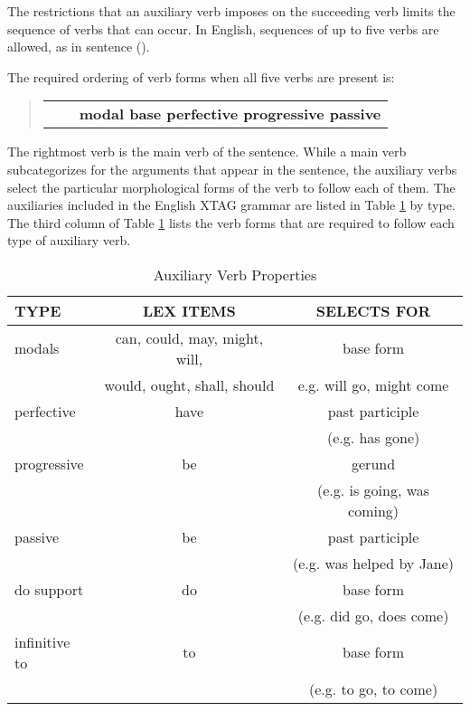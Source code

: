 \noindent The restrictions that an auxiliary verb imposes on the succeeding verb limits
the sequence of verbs that can occur.  In English, sequences of up to five
verbs are allowed, as in sentence ().


\noindent 
The required ordering of verb forms when all five verbs are present is:

\begin{quote}
\begin{tabular}{ccl}
& & {\bf modal base perfective progressive passive}
\end{tabular}
\end{quote}

\noindent
The rightmost verb is the main verb of the sentence.  While a main verb
subcategorizes for the arguments that appear in the sentence, the auxiliary
verbs select the particular morphological forms of the verb to follow each of
them.  The auxiliaries included in the English XTAG grammar are listed in Table
\ref{aux-table} by type.  The third column of Table \ref{aux-table} lists the
verb forms that are required to follow each type of auxiliary verb.

\begin{table}[ht]
\centering
\begin{tabular}{|l|c|c|}  
\hline
TYPE&LEX ITEMS&SELECTS FOR\\     
\hline
modals & can, could, may, might, will, & base form\footnotemark
\\ & would, ought, shall, should & e.g. will
go, might come\\
\hline
perfective & have & past participle\\
& & (e.g. has gone)\\  
\hline
progressive & be & gerund\\
& & (e.g. is going, was coming)\\  
\hline
passive & be & past participle\\
& & (e.g. was helped by Jane)\\  
\hline
do support & do &base form\\
& & (e.g. did go, does come)\\  
\hline
infinitive to & to & base form\\
& & (e.g. to go, to come)\\  
\hline
\end{tabular}
\caption{Auxiliary Verb Properties}
\label{aux-table}
\end{table}

